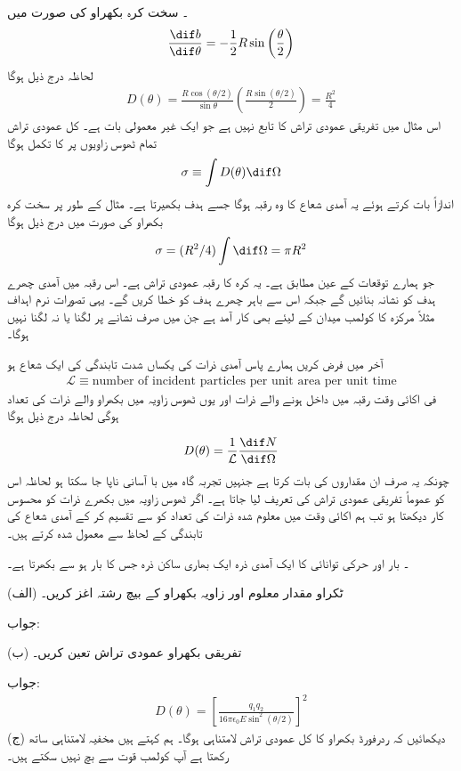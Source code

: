 ۔ سخت کرہ بکھراو  کی صورت میں 
\begin{align}
	\frac{\dif b}{\dif\theta}=-\frac{1}{2}R\sin\left(\frac{\theta}{2}\right)
\end{align}
لحاظہ درج ذیل ہوگا 
\begin{align}
	D(\theta) = \frac{R\cos(\theta/2)}{\sin\theta}\left(\frac{R\sin(\theta/2)}{2}\right) = \frac{R^2}{4}
\end{align}
اس مثال میں تفریقی عمودی تراش  کا تابع نہیں ہے جو ایک غیر معمولی بات ہے۔
کل عمودی تراش تمام ٹھوس زاویوں پر  کا تکمل ہوگا
\begin{align}
	\sigma\equiv\int D(\theta)\dif\Omega	
\end{align}
اندازاً بات کرتے ہوئے یہ آمدی شعاع کا وہ رقبہ ہوگا جسے ہدف بکھیرتا ہے۔ مثال کے طور پر سخت کرہ بکھراو کی صورت میں درج ذیل ہوگا
\begin{align}
	\sigma = (R^2/4)\int \dif\Omega = \pi R^2
\end{align}
جو ہمارے توقعات کے عین مطابق ہے۔ یہ کرہ کا رقبہ عمودی تراش ہے۔ اس رقبہ میں آمدی چھرے ہدف کو نشانہ بنائیں گے جبکہ اس سے باہر چھرے ہدف کو خطا کریں گے۔ یہی تصورات نرم اہداف مثلاً مرکزہ کا کولمب میدان کے لیئے بھی کار آمد ہے جن میں صرف نشانے پر لگنا یا نہ لگنا نہیں ہوگا۔

آخر میں فرض کریں ہمارے پاس آمدی ذرات کی یکساں شدت تابندگی کی ایک شعاع ہو 
\begin{align}
	\mathcal{L}\equiv\text{number of incident particles per unit area per unit time}
\end{align}
فی اکائی وقت رقبہ  میں داخل ہونے والے ذرات اور یوں ٹھوس زاویہ  میں بکھراو والے ذرات کی تعداد   ہوگی لحاظہ درج ذیل ہوگا 

\begin{align}
	D(\theta) = \frac{1}{\mathcal{L}}\frac{\dif N}{\dif\Omega}
\end{align}
چونکہ یہ صرف ان مقداروں کی بات کرتا ہے جنہیں تجربہ گاہ میں با آسانی ناپا جا سکتا ہو لحاظہ اس کو عموماً تفریقی عمودی تراش کی تعریف لیا جاتا ہے۔ اگر ٹھوس زاویہ  میں بکھرے ذرات کو محسوس کار دیکھتا ہو تب ہم اکائی وقت میں معلوم شدہ ذرات کی تعداد کو  سے تقسیم کر کے آمدی شعاع کی تابندگی کے لحاظ سے معمول شدہ کرتے ہیں۔

۔ بار  اور حرکی توانائی  کا ایک آمدی ذرہ ایک بھاری ساکن ذرہ جس کا بار  ہو 	سے بکھرتا ہے۔

(الف) ٹکراو مقدار معلوم اور زاویہ بکھراو کے بیچ رشتہ اغز کریں۔

جواب: 

(ب) تفریقی بکھراو عمودی تراش تعین کریں۔

جواب:
\begin{align}
	D(\theta)=\left[\frac{q_1q_2}{16\pi\epsilon_0E\sin^2(\theta/2)}\right]^2
\end{align}
(ج) دیکھائیں کہ ردرفورڈ بکھراو کا کل عمودی تراش لامتناہی ہوگا۔ ہم کہتے ہیں  مخفیہ لامتناہی ساتھ رکھتا ہے آپ کولمب قوت سے بچ نہیں سکتے ہیں۔

